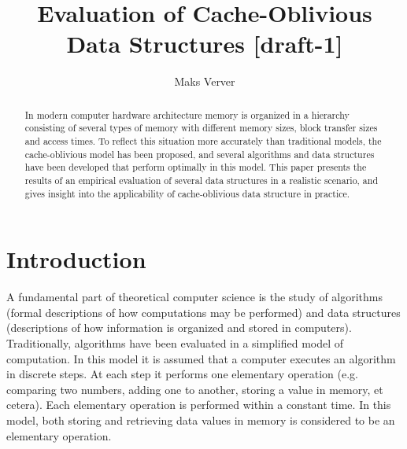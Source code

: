 \documentclass{acm_proc_article-sp}
\begin{document}
\title{Evaluation of Cache-Oblivious Data Structures [draft-1]}

\author{Maks Verver\\ }


\maketitle

\begin{abstract}
In modern computer hardware architecture memory is organized in a hierarchy
consisting of several types of memory with different memory sizes, block
transfer sizes and access times. To reflect this situation more accurately
than traditional models, the cache-oblivious model has been proposed, and
several algorithms and data structures have been developed that perform
optimally in this model.
This paper presents the results of an empirical evaluation of several data
structures in a realistic scenario, and gives insight into the applicability
of cache-oblivious data structure in practice.
\end{abstract}



\section{Introduction}
A fundamental part of theoretical computer science is the study of algorithms (formal descriptions of how computations may be performed) and data structures (descriptions of how information is organized and stored in computers). Traditionally, algorithms have been evaluated in a simplified model of computation. In this model it is assumed that a computer executes an algorithm in discrete steps. At each step it performs one elementary operation (e.g. comparing two numbers, adding one to another, storing a value in memory, et cetera). Each elementary operation is performed within a constant time. In this model, both storing and retrieving data values in memory is considered to be an elementary operation.
\end{document}
